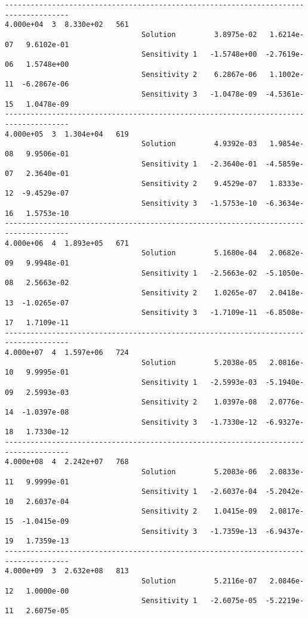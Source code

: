 \begin{verbatim}
-------------------------------------------------------------------------------------
4.000e+04  3  8.330e+02   561
                                Solution         3.8975e-02   1.6214e-07   9.6102e-01 
                                Sensitivity 1   -1.5748e+00  -2.7619e-06   1.5748e+00 
                                Sensitivity 2    6.2867e-06   1.1002e-11  -6.2867e-06 
                                Sensitivity 3   -1.0478e-09  -4.5361e-15   1.0478e-09 
-------------------------------------------------------------------------------------
4.000e+05  3  1.304e+04   619
                                Solution         4.9392e-03   1.9854e-08   9.9506e-01 
                                Sensitivity 1   -2.3640e-01  -4.5859e-07   2.3640e-01 
                                Sensitivity 2    9.4529e-07   1.8333e-12  -9.4529e-07 
                                Sensitivity 3   -1.5753e-10  -6.3634e-16   1.5753e-10 
-------------------------------------------------------------------------------------
4.000e+06  4  1.893e+05   671
                                Solution         5.1680e-04   2.0682e-09   9.9948e-01 
                                Sensitivity 1   -2.5663e-02  -5.1050e-08   2.5663e-02 
                                Sensitivity 2    1.0265e-07   2.0418e-13  -1.0265e-07 
                                Sensitivity 3   -1.7109e-11  -6.8508e-17   1.7109e-11 
-------------------------------------------------------------------------------------
4.000e+07  4  1.597e+06   724
                                Solution         5.2038e-05   2.0816e-10   9.9995e-01 
                                Sensitivity 1   -2.5993e-03  -5.1940e-09   2.5993e-03 
                                Sensitivity 2    1.0397e-08   2.0776e-14  -1.0397e-08 
                                Sensitivity 3   -1.7330e-12  -6.9327e-18   1.7330e-12 
-------------------------------------------------------------------------------------
4.000e+08  4  2.242e+07   768
                                Solution         5.2083e-06   2.0833e-11   9.9999e-01 
                                Sensitivity 1   -2.6037e-04  -5.2042e-10   2.6037e-04 
                                Sensitivity 2    1.0415e-09   2.0817e-15  -1.0415e-09 
                                Sensitivity 3   -1.7359e-13  -6.9437e-19   1.7359e-13 
-------------------------------------------------------------------------------------
4.000e+09  3  2.632e+08   813
                                Solution         5.2116e-07   2.0846e-12   1.0000e-00 
                                Sensitivity 1   -2.6075e-05  -5.2219e-11   2.6075e-05 

\end{verbatim}
